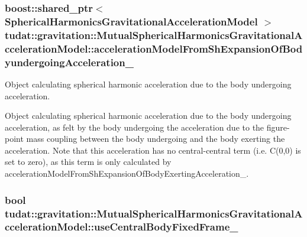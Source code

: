 \subsubsection[{\texorpdfstring{acceleration\+Model\+From\+Sh\+Expansion\+Of\+Bodyundergoing\+Acceleration\+\_\+}{accelerationModelFromShExpansionOfBodyundergoingAcceleration_}}]{\setlength{\rightskip}{0pt plus 5cm}boost\+::shared\+\_\+ptr$<$ {\bf Spherical\+Harmonics\+Gravitational\+Acceleration\+Model} $>$ tudat\+::gravitation\+::\+Mutual\+Spherical\+Harmonics\+Gravitational\+Acceleration\+Model\+::acceleration\+Model\+From\+Sh\+Expansion\+Of\+Bodyundergoing\+Acceleration\+\_\+\hspace{0.3cm}{\ttfamily [protected]}}\hypertarget{classtudat_1_1gravitation_1_1MutualSphericalHarmonicsGravitationalAccelerationModel_a0cca31351eb37f661aea828b1cae6848}{}\label{classtudat_1_1gravitation_1_1MutualSphericalHarmonicsGravitationalAccelerationModel_a0cca31351eb37f661aea828b1cae6848}


Object calculating spherical harmonic acceleration due to the body undergoing acceleration. 

Object calculating spherical harmonic acceleration due to the body undergoing acceleration, as felt by the body undergoing the acceleration due to the figure-\/point mass coupling between the body undergoing and the body exerting the acceleration. Note that this acceleration has no central-\/central term (i.\+e. C(0,0) is set to zero), as this term is only calculated by acceleration\+Model\+From\+Sh\+Expansion\+Of\+Body\+Exerting\+Acceleration\+\_\+. 
\subsubsection[{\texorpdfstring{use\+Central\+Body\+Fixed\+Frame\+\_\+}{useCentralBodyFixedFrame_}}]{\setlength{\rightskip}{0pt plus 5cm}bool tudat\+::gravitation\+::\+Mutual\+Spherical\+Harmonics\+Gravitational\+Acceleration\+Model\+::use\+Central\+Body\+Fixed\+Frame\+\_\+\hspace{0.3cm}{\ttfamily [protected]}}\hypertarget{classtudat_1_1gravitation_1_1MutualSphericalHarmonicsGravitationalAccelerationModel_aebd70be134dd6b05ae3c322c129dd848}{}\label{classtudat_1_1gravitation_1_1MutualSphericalHarmonicsGravitationalAccelerationModel_aebd70be134dd6b05ae3c322c129dd848}


